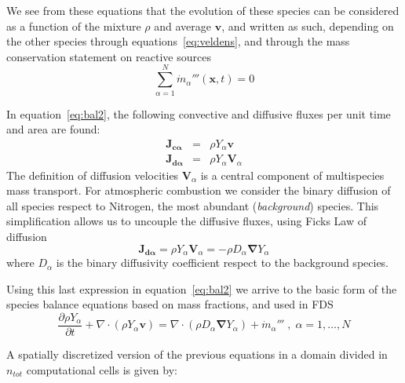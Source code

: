 \documentclass[12pt]{article}
\begin{document}
We see from these equations that the evolution of these species can be considered as a function of the mixture $\rho$ and average $\mathbf{v}$, and written as such, depending on the other species through equations~\eqref{eq:veldens}, and through the mass conservation statement on reactive sources
%
\begin{equation}
  \sum\limits_{\alpha=1}^{N} \dot{m}_\alpha'''(\mathbf{x},t) = 0
\end{equation}
%

In equation~\eqref{eq:bal2}, the following convective and diffusive fluxes per unit time and area are found:
%
\begin{eqnarray}
  \mathbf{J_{c \alpha}} &=& \rho Y_\alpha  \mathbf{v} \label{eq:jc} \\
  \mathbf{J_{d \alpha}} &=& \rho Y_\alpha  \mathbf{V}_\alpha \label{eq:jd}
\end{eqnarray}
%
The definition of diffusion velocities $\mathbf{V}_\alpha$ is a central component of multispecies mass transport. For atmospheric combustion we consider the binary diffusion of all species respect to Nitrogen, the most abundant (\textit{background}) species. This simplification allows us to uncouple the diffusive fluxes, using Ficks Law of diffusion
%
\begin{equation}
   \mathbf{J_{d \alpha}} = \rho Y_\alpha  \mathbf{V}_\alpha = - \rho D_\alpha \boldsymbol{\nabla} Y_\alpha \label{eq:fick}
\end{equation}
%
where $D_\alpha$ is the binary diffusivity coefficient respect to the background species.

Using this last expression in equation~\eqref{eq:bal2} we arrive to the basic form of the species balance equations based on mass fractions, and used in FDS
%
\begin{equation}
   \frac{\partial \rho Y_\alpha}{ \partial t} + \nabla \cdot ( \rho Y_\alpha  \mathbf{v} ) = \nabla \cdot ( \rho D_\alpha \boldsymbol{\nabla} Y_\alpha ) + \dot{m}_\alpha''' \; , \; \alpha=1,\dots,N \label{eq:bal3}
\end{equation}
%

A spatially discretized version of the previous equations in a domain divided in $n_{tot}$ computational cells is given by:
\end{document}
